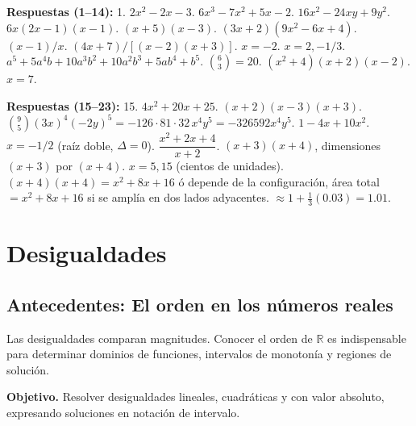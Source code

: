 \documentclass[12pt,letterpaper]{book}
\begin{document}
\textbf{Respuestas (1--14):} 1. $2x^2-2x-3$. $6x^3-7x^2+5x-2$. $16x^2-24xy+9y^2$. $6x(2x-1)(x-1)$. $(x+5)(x-3)$. $(3x+2)(9x^2-6x+4)$. $(x-1)/x$. $(4x+7)/[(x-2)(x+3)]$. $x=-2$. $x=2,-1/3$. $a^5+5a^4b+10a^3b^2+10a^2b^3+5ab^4+b^5$. $\binom{6}{3}=20$. $(x^2+4)(x+2)(x-2)$. $x=7$.

\textbf{Respuestas (15--23):} 15. $4x^2+20x+25$. $(x+2)(x-3)(x+3)$. $\binom{9}{5}(3x)^4(-2y)^5=-126\cdot81\cdot32\,x^4y^5=-326592x^4y^5$. $1-4x+10x^2$. $x=-1/2$ (raíz doble, $\Delta=0$). $\dfrac{x^2+2x+4}{x+2}$. $(x+3)(x+4)$, dimensiones $(x+3)$ por $(x+4)$. $x=5,15$ (cientos de unidades). $(x+4)(x+4)=x^2+8x+16$ ó depende de la configuración, área total $=x^2+8x+16$ si se amplía en dos lados adyacentes. $\approx1+\tfrac{1}{3}(0.03)=1.01$.

\chapter{Desigualdades}

\section*{Antecedentes: El orden en los números reales}

Las desigualdades comparan magnitudes. Conocer el orden de $\mathbb{R}$ es indispensable para determinar dominios de funciones, intervalos de monotonía y regiones de solución.

\begin{center}
\end{center}

\textbf{Objetivo.} Resolver desigualdades lineales, cuadráticas y con valor absoluto, expresando soluciones en notación de intervalo.
\end{document}
